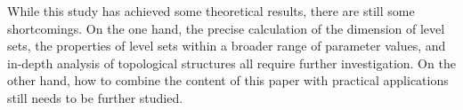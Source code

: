 While this study has achieved some theoretical results, there are still some shortcomings. On the one hand, the precise calculation of the dimension of level sets, the properties of level sets within a broader range of parameter values, and in-depth analysis of topological structures all require further investigation. On the other hand, how to combine the content of this paper with practical applications still needs to be further studied.

